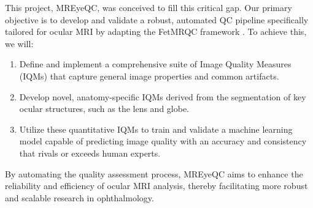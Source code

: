 This project, MREyeQC, was conceived to fill this critical gap. Our primary objective is to develop and validate a robust, automated QC pipeline specifically tailored for ocular MRI by adapting the FetMRQC framework \cite{noauthor_medical-image-analysis-laboratoryfetmrqc_sr_nodate}. To achieve this, we will:
\begin{enumerate}
    \item Define and implement a comprehensive suite of Image Quality Measures (IQMs) that capture general image properties and common artifacts.
    \item Develop novel, anatomy-specific IQMs derived from the segmentation of key ocular structures, such as the lens and globe.
    \item Utilize these quantitative IQMs to train and validate a machine learning model capable of predicting image quality with an accuracy and consistency that rivals or exceeds human experts.
\end{enumerate}

By automating the quality assessment process, MREyeQC aims to enhance the reliability and efficiency of ocular MRI analysis, thereby facilitating more robust and scalable research in ophthalmology.
